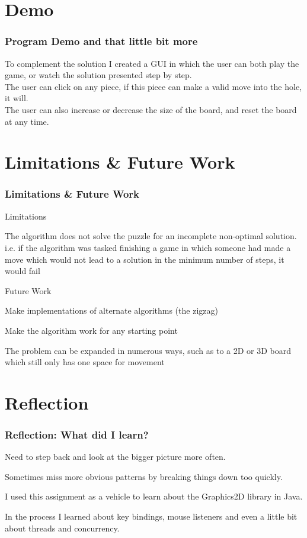\documentclass{beamer}
\begin{document}
\section{Demo}
	\begin{frame}
		\frametitle{Program Demo and that little bit more}
		To complement the solution I created a GUI in which the user can both play the game, or 
		watch the solution presented step by step. \\
		\vfill
		The user can click on any piece, if this piece can make a valid move into the hole, it will. \\
		\vfill
		The user can also increase or decrease the size of the board, and reset the board at any time. 
		
	\end{frame}
\section{Limitations \& Future Work}
	\begin{frame}
		\frametitle{Limitations \& Future Work}
		Limitations
		\blt
			\item The algorithm does not solve the puzzle for an incomplete non-optimal solution. \\
			\tab i.e. if the algorithm was tasked finishing a game in which someone had made a move which
			 would not lead to a solution in the minimum number of steps, it would fail
		\finblt
		
		Future Work
		\blt
			\item Make implementations of alternate algorithms (the zigzag)
			\item Make the algorithm work for any starting point
			\item The problem can be expanded in numerous ways, such as to a 2D or 3D board which still 
			only has one space for movement
			
		\finblt
	\end{frame}
\section{Reflection}
	\begin{frame}
		\frametitle{Reflection: What did I learn?}

		\blt
			\item Need to step back and look at the bigger picture more often. 
			\item Sometimes miss 
			more obvious patterns by breaking things down too quickly.
			\vfill
			\item I used this assignment as a vehicle to learn about the Graphics2D library in Java. 
			\item In the process I learned about key bindings, mouse listeners and even a little bit about 
			threads and concurrency. 
		\finblt
		

	\end{frame}
	
\end{document}
